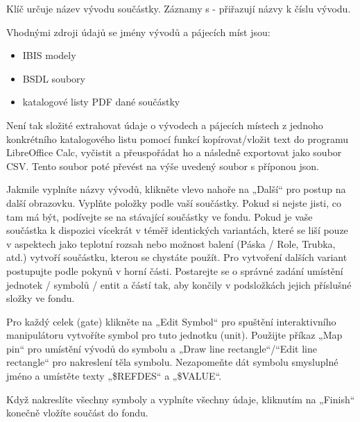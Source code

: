 \documentclass[letterpaper,10pt,czech]{sphinxmanual}
\begin{document}
Klíč určuje název vývodu součástky. Záznamy s - přiřazují názvy k číslu vývodu.

Vhodnými zdroji údajů se jmény vývodů a pájecích míst jsou:
\begin{itemize}
\item {} 
IBIS modely

\item {} 
BSDL soubory

\item {} 
katalogové listy PDF dané součástky

\end{itemize}

Není tak složité extrahovat údaje o vývodech a pájecích místech z jednoho konkrétního katalogového listu pomocí funkcí kopírovat/vložit text do programu LibreOffice Calc, vyčistit a přeuspořádat ho a následně
exportovat jako soubor CSV. Tento soubor poté převést na výše uvedený soubor s příponou json.

Jakmile vyplníte názvy vývodů, klikněte vlevo nahoře na „Další“ pro postup na další obrazovku. Vyplňte položky podle  vaší součástky. Pokud si nejste jisti, co tam má být, podívejte se na stávající součástky ve fondu. Pokud je vaše součástka k dispozici vícekrát v téměř identických variantách, které se liší pouze v aspektech jako teplotní rozsah nebo možnost balení (Páska / Role, Trubka, atd.) vytvoří součástku, kterou se chystáte použít. Pro vytvoření dalších variant postupujte podle pokynů v horní části. Postarejte se o správné zadání umístění jednotek / symbolů / entit a částí tak, aby končily v podsložkách jejich příslušné složky ve fondu.

Pro každý celek (gate) klikněte na „Edit Symbol“ pro spuštění interaktivního
manipulátoru vytvoříte symbol pro tuto jednotku (unit). Použijte příkaz „Map pin“
pro umístění vývodů do symbolu a „Draw line rectangle“/“Edit line
rectangle“ pro nakreslení těla symbolu. Nezapomeňte dát symbolu
smysluplné jméno a umístěte texty „\$REFDES“ a „\$VALUE“.

Když nakreslíte všechny symboly a vyplníte všechny údaje,
kliknutím na „Finish“ konečně vložíte součást do fondu.
\end{document}

